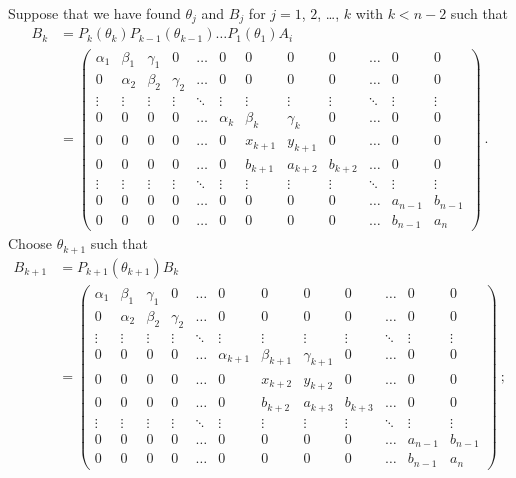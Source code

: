 Suppose that we have found $\theta_j$ and $B_j$ for $j=1$, $2$,
\ldots, $k$ with $k<n-2$ such that
\begin{align*}
B_k &= P_k(\theta_k) P_{k-1}(\theta_{k-1}) \ldots P_1(\theta_1) A_i \\
&= \left(
\begin{array}{cccccccccccc}
\alpha_1 & \beta_1 & \gamma_1 & 0 & \ldots & 0 & 0 & 0 & 0 & \ldots & 0 & 0 \\
0 & \alpha_2 & \beta_2 & \gamma_2 & \ldots & 0 & 0 & 0 & 0 & \ldots & 0 & 0 \\
\vdots & \vdots & \vdots & \vdots & \ddots & \vdots & \vdots & \vdots &
\vdots & \ddots & \vdots & \vdots \\
0 & 0 & 0 & 0 & \ldots & \alpha_k & \beta_k & \gamma_k & 0 & \ldots & 0 & 0\\ 
0 & 0 & 0 & 0 & \ldots & 0 & x_{k+1} & y_{k+1} & 0 & \ldots & 0 & 0 \\
0 & 0 & 0 & 0 & \ldots & 0 & b_{k+1} & a_{k+2} & b_{k+2} & \ldots & 0 & 0 \\
\vdots & \vdots & \vdots & \vdots & \ddots & \vdots & \vdots & \vdots &
\vdots & \ddots & \vdots & \vdots \\
0 & 0 & 0 & 0 & \ldots & 0 & 0 & 0 & 0 & \ldots & a_{n-1} & b_{n-1} \\
0 & 0 & 0 & 0 & \ldots & 0 & 0 & 0 & 0 & \ldots & b_{n-1} & a_n
\end{array}\right) \ .
\end{align*}
Choose $\theta_{k+1}$ such that
\begin{align*}
B_{k+1} &= P_{k+1}(\theta_{k+1}) B_k \\
&= \left(
\begin{array}{cccccccccccc}
\alpha_1 & \beta_1 & \gamma_1 & 0 & \ldots & 0 & 0 & 0 & 0 & \ldots & 0 & 0 \\
0 & \alpha_2 & \beta_2 & \gamma_2 & \ldots & 0 & 0 & 0 & 0 & \ldots & 0 & 0 \\
\vdots & \vdots & \vdots & \vdots & \ddots & \vdots & \vdots & \vdots &
\vdots & \ddots & \vdots & \vdots \\
0 & 0 & 0 & 0 & \ldots & \alpha_{k+1} & \beta_{k+1} & \gamma_{k+1} & 0 &
\ldots & 0 & 0 \\
0 & 0 & 0 & 0 & \ldots & 0 & x_{k+2} & y_{k+2} & 0 & \ldots & 0 & 0 \\
0 & 0 & 0 & 0 & \ldots & 0 & b_{k+2} & a_{k+3} & b_{k+3} & \ldots & 0 & 0 \\
\vdots & \vdots & \vdots & \vdots & \ddots & \vdots & \vdots & \vdots &
\vdots & \ddots & \vdots & \vdots \\
0 & 0 & 0 & 0 & \ldots & 0 & 0 & 0 & 0 & \ldots & a_{n-1} & b_{n-1} \\
0 & 0 & 0 & 0 & \ldots & 0 & 0 & 0 & 0 & \ldots & b_{n-1} & a_n
\end{array}\right) \ ;
\end{align*}

